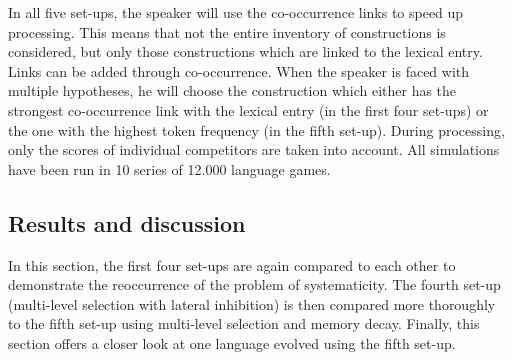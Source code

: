 In all five set-ups, the speaker will use the co-occurrence links to speed up processing. This means that not the entire inventory of constructions is considered, but only those constructions which are linked to the lexical entry. Links can be added through co-occurrence. When the speaker is faced with multiple hypotheses, he will choose the construction which either has the strongest co-occurrence link with the lexical entry (in the first four set-ups) or the one with the highest token frequency (in the fifth set-up). During processing, only the scores of individual competitors are taken into account. All simulations have been run in 10 series of 12.000 language games.

\subsection{Results and discussion}

In this section, the first four set-ups are again compared to each other to demonstrate the reoccurrence of the problem of systematicity. The fourth set-up (multi-level selection with lateral inhibition) is then compared more thoroughly to the fifth set-up using multi-level selection and memory decay. Finally, this section offers a closer look at one language evolved using the fifth set-up.

